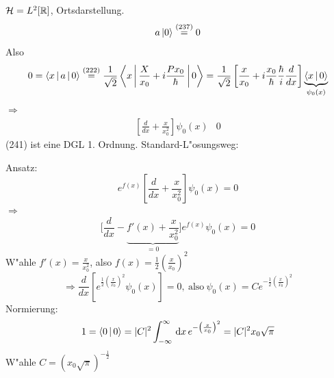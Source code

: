 \documentclass[a4paper]{scrartcl}
\newcommand{\RR}{\ensuremath \mathbb{R}}
\newcommand{\dd}{\ensuremath \, \mathrm{d}}
\begin{document}
{$\mathcal H = L^2[\RR]$, Ortsdarstellung.
$$a \ket 0 \stackrel{(237)}= 0 $$
Also
$$0 = \Braket{ x | a | 0 } \stackrel{(222)}= \frac1{\sqrt 2} \Braket{ x | \frac X {x_0} + i \frac{P x_0 }\hbar | 0 } = \frac 1{\sqrt 2} \left[ \frac x {x_0} + i \frac{ x_0}\hbar \frac \hbar i \frac d {dx} \right] \underbrace{ \Braket{ x| 0}}_{\psi_0(x)}$$
$\Longrightarrow$
\begin{align}
\left[ \frac d{dx} + \frac x{x_0^2} \right] \psi_0(x) & 0 
\end{align}
(241) ist eine DGL 1. Ordnung. Standard-L"osungsweg:

Ansatz: 
$$e^{f(x)} \left[ \frac d{dx} + \frac x{x_0^2} \right] \psi_0(x) = 0$$
$\Longrightarrow$
$$\Big[ \frac d {dx} - \underbrace{f'(x) + \frac x {x_0^2} }_{=0} \Big] e^{f(x)} \psi_0(x) = 0$$
W"ahle $f'(x) = \frac x {x_0^2}$, also $f(x) = \frac12 \left( \frac x{x_0} \right)^2$
$$\Longrightarrow \frac d{dx} \left[ e^{\frac 12 \left( \frac x{x_0} \right)^2} \psi_0(x) \right] =0, \ \mathrm{ also \ } \psi_0(x) = C e^{-\frac12 \left( \frac x{x_0} \right)^2}$$
Normierung:
$$1 = \Braket {0 | 0 } = \vert C \vert^2 \int_{-\infty}^\infty \dd x \, e^{- \left( \frac x{x_0} \right)^2} = \vert C \vert^2 x_0 \sqrt \pi$$
W"ahle $C = (x_0 \sqrt \pi)^{-\frac 12}$

}
\end{document}
